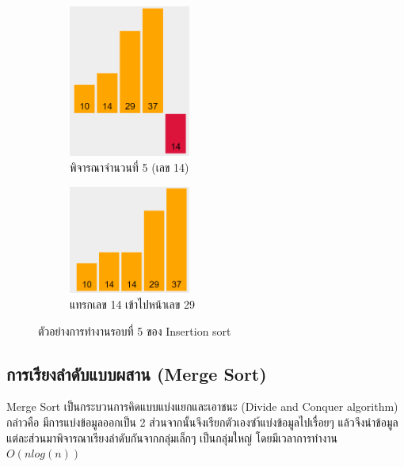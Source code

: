 \begin{figure}[h!]
	\centering
    \begin{subfigure}{.5\textwidth}
    	\centering
        \includegraphics[width=4cm]{images/insertion_sort_round-5-1}
        \caption{พิจารณาจำนวนที่ 5 (เลข 14)}
        \label{fig:insertion_sort_round-5-1}
    \end{subfigure}%
    \begin{subfigure}{.5\textwidth}
    	\centering
        \includegraphics[width=4cm]{images/insertion_sort_round-5-2}
        \caption{แทรกเลข 14 เข้าไปหน้าเลข 29}
        \label{fig:insertion_sort_round-2-2}
    \end{subfigure}
    \caption{ตัวอย่างการทำงานรอบที่ 5 ของ Insertion sort}
    \label{fig:insertion_sort_round-2}
\end{figure}

\subsection{การเรียงลำดับแบบผสาน (Merge Sort)}

Merge Sort เป็นกระบวนการคิดแบบแบ่งแยกและเอาชนะ (Divide and Conquer algorithm) กล่าวคือ มีการแบ่งข้อมูลออกเป็น 2 ส่วนจากนั้นจึงเรียกตัวเองซำ้แบ่งข้อมูลไปเรื่อยๆ แล้วจึงนำข้อมูลแต่ละส่วนมาพิจารณาเรียงลำดับกันจากกลุ่มเล็กๆ เป็นกลุ่มใหญ่ โดยมีเวลาการทำงาน $O(n log(n))$

